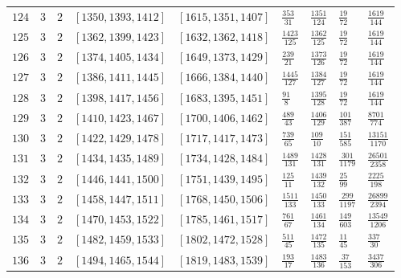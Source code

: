 \documentclass[12pt]{extarticle}
\begin{document}
\begin{longtable}{lllllllll}
$124$ & $3$ & $2$ & $\left[1350, 1393, 1412\right]$ & $\left[1615, 1351, 1407\right]$ & $\frac{353}{31}$ & $\frac{1351}{124}$ & $\frac{19}{72}$ & $\frac{1619}{144}$ \\
$125$ & $3$ & $2$ & $\left[1362, 1399, 1423\right]$ & $\left[1632, 1362, 1418\right]$ & $\frac{1423}{125}$ & $\frac{1362}{125}$ & $\frac{19}{72}$ & $\frac{1619}{144}$ \\
$126$ & $3$ & $2$ & $\left[1374, 1405, 1434\right]$ & $\left[1649, 1373, 1429\right]$ & $\frac{239}{21}$ & $\frac{1373}{126}$ & $\frac{19}{72}$ & $\frac{1619}{144}$ \\
$127$ & $3$ & $2$ & $\left[1386, 1411, 1445\right]$ & $\left[1666, 1384, 1440\right]$ & $\frac{1445}{127}$ & $\frac{1384}{127}$ & $\frac{19}{72}$ & $\frac{1619}{144}$ \\
$128$ & $3$ & $2$ & $\left[1398, 1417, 1456\right]$ & $\left[1683, 1395, 1451\right]$ & $\frac{91}{8}$ & $\frac{1395}{128}$ & $\frac{19}{72}$ & $\frac{1619}{144}$ \\
$129$ & $3$ & $2$ & $\left[1410, 1423, 1467\right]$ & $\left[1700, 1406, 1462\right]$ & $\frac{489}{43}$ & $\frac{1406}{129}$ & $\frac{101}{387}$ & $\frac{8701}{774}$ \\
$130$ & $3$ & $2$ & $\left[1422, 1429, 1478\right]$ & $\left[1717, 1417, 1473\right]$ & $\frac{739}{65}$ & $\frac{109}{10}$ & $\frac{151}{585}$ & $\frac{13151}{1170}$ \\
$131$ & $3$ & $2$ & $\left[1434, 1435, 1489\right]$ & $\left[1734, 1428, 1484\right]$ & $\frac{1489}{131}$ & $\frac{1428}{131}$ & $\frac{301}{1179}$ & $\frac{26501}{2358}$ \\
$132$ & $3$ & $2$ & $\left[1446, 1441, 1500\right]$ & $\left[1751, 1439, 1495\right]$ & $\frac{125}{11}$ & $\frac{1439}{132}$ & $\frac{25}{99}$ & $\frac{2225}{198}$ \\
$133$ & $3$ & $2$ & $\left[1458, 1447, 1511\right]$ & $\left[1768, 1450, 1506\right]$ & $\frac{1511}{133}$ & $\frac{1450}{133}$ & $\frac{299}{1197}$ & $\frac{26899}{2394}$ \\
$134$ & $3$ & $2$ & $\left[1470, 1453, 1522\right]$ & $\left[1785, 1461, 1517\right]$ & $\frac{761}{67}$ & $\frac{1461}{134}$ & $\frac{149}{603}$ & $\frac{13549}{1206}$ \\
$135$ & $3$ & $2$ & $\left[1482, 1459, 1533\right]$ & $\left[1802, 1472, 1528\right]$ & $\frac{511}{45}$ & $\frac{1472}{135}$ & $\frac{11}{45}$ & $\frac{337}{30}$ \\
$136$ & $3$ & $2$ & $\left[1494, 1465, 1544\right]$ & $\left[1819, 1483, 1539\right]$ & $\frac{193}{17}$ & $\frac{1483}{136}$ & $\frac{37}{153}$ & $\frac{3437}{306}$ \\

\end{longtable}
\end{document}
